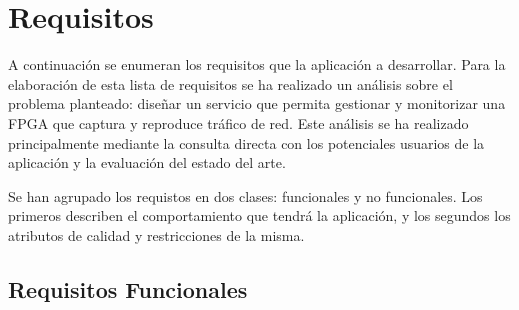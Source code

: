 \chapter{Requisitos\label{cap:requisitos}}

A continuación se enumeran los requisitos que la aplicación a desarrollar. Para la elaboración de esta lista de requisitos se ha realizado un análisis sobre el problema planteado: diseñar un servicio que permita gestionar y monitorizar una \gls{FPGA} que captura y reproduce tráfico de red. Este análisis se ha realizado principalmente mediante la consulta directa con los potenciales usuarios de la aplicación y la evaluación del estado del arte.

Se han agrupado los requistos en dos clases: funcionales y no funcionales. Los primeros describen el comportamiento que tendrá la aplicación, y los segundos los atributos de calidad y restricciones de la misma.


\section{Requisitos Funcionales\label{sec:req:rf}}

